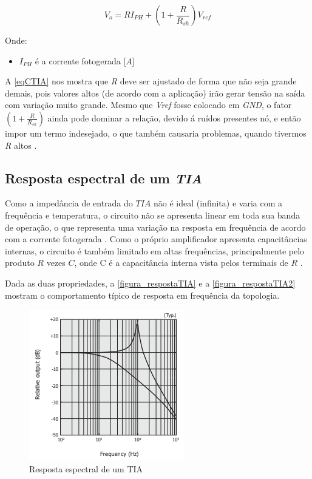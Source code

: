 \begin{equation}
    \label{eqCTIA}
    V_o = RI_{PH} + (1+\frac{R}{R_{sh}})V_{ref}
\end{equation}

Onde:
\begin{itemize}
    \item $I_{PH}$ \'e a corrente fotogerada [$A$]
\end{itemize}

A \autoref{eqCTIA} nos mostra que \emph{R} deve ser ajustado de forma que n\~ao seja grande demais, pois valores altos (de acordo com a aplicação) irão gerar tens\~ao na sa\'ida com varia{\c c}\~ao muito grande. Mesmo que \emph{Vref} fosse colocado em \emph{GND}, o fator $(1+\frac{R}{R_{sh}})$ ainda pode dominar a relação, devido \'a ruídos presentes nó, e então impor um termo indesejado, o que também causaria problemas, quando tivermos \emph{R} altos \cite{hamamatsu}.

\subsection{Resposta espectral de um \emph{TIA}}

Como a imped\^ancia de entrada do $TIA$ n\~ao \'e ideal (infinita) e varia com a frequ\^encia e temperatura, o circuito n\~ao se apresenta linear em toda sua banda de opera{\c c}\~ao, o que representa uma varia{\c c}\~ao na resposta em frequ\^encia de acordo com a corrente fotogerada \cite{hamamatsu}.
Como o pr\'oprio amplificador apresenta capacit\^ancias internas, o circuito \'e tamb\'em limitado em altas frequ\^encias, principalmente pelo produto $R$ vezes $C$, onde C \'e a capacit\^ancia interna vista pelos terminais de $R$ \cite{hamamatsu}.

Dada as duas propriedades, a \autoref{figura_respostaTIA} e a \autoref{figura_respostaTIA2} mostram o comportamento t\'ipico de resposta em frequ\^encia da topologia.

\begin{figure}[htb]
	\caption{\label{figura_respostaTIA}Resposta espectral de um TIA}
	\begin{center}
	    \includegraphics[scale=0.8]{Imagens/RespostaEspectralTIA.png}
	\end{center}
\end{figure}

